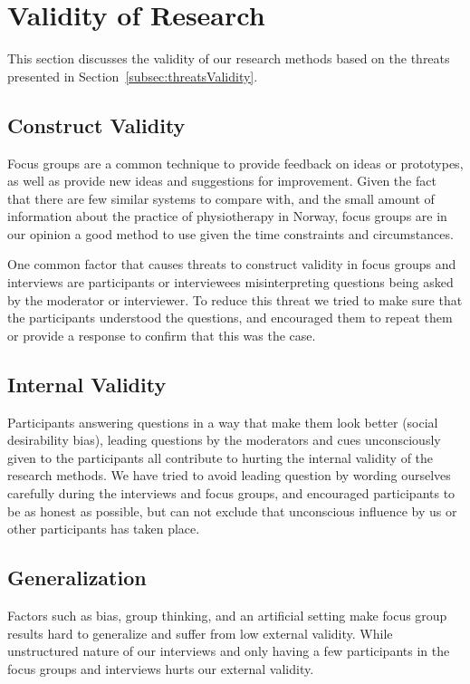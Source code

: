 \section{Validity of Research}
This section discusses the validity of our research methods based on the threats presented in Section~\ref{subsec:threatsValidity}.

\subsection{Construct Validity}

Focus groups are a common technique to provide feedback on ideas or prototypes, as well as provide new ideas and suggestions for improvement. Given the fact that there are few similar systems to compare with, and the small amount of information about the practice of physiotherapy in Norway, focus groups are in our opinion a good method to use given the time constraints and circumstances.

One common factor that causes threats to construct validity in focus groups and interviews are participants or interviewees misinterpreting questions being asked by the moderator or interviewer. To reduce this threat we tried to make sure that the participants understood the questions, and encouraged them to repeat them or provide a response to confirm that this was the case.

\subsection{Internal Validity}
Participants answering questions in a way that make them look better (social desirability bias), leading questions by the moderators and cues unconsciously given to the participants all contribute to hurting the internal validity of the research methods. We have tried to avoid leading question by wording ourselves carefully during the interviews and focus groups, and encouraged participants to be as honest as possible, but can not exclude that unconscious influence by us or other participants has taken place.

\subsection{Generalization}
Factors such as bias, group thinking, and an artificial setting make focus group results hard to generalize and suffer from low external validity. While unstructured nature of our interviews and only having a few participants in the focus groups and interviews hurts our external validity.

